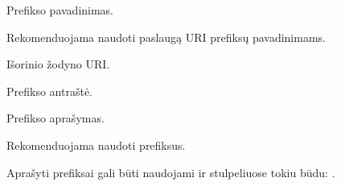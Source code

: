 \documentclass[letterpaper,10pt,lithuanian]{sphinxmanual}
\begin{document}
\begin{fulllineitems}
\label{\detokenize{dimensijos:prefix.ref}}
\pysigstartsignatures
\pysigline
{}
\pysigstopsignatures
\sphinxAtStartPar
Prefikso pavadinimas.

\sphinxAtStartPar
Rekomenduojama naudoti  paslaugą URI prefiksų pavadinimams.

\end{fulllineitems}


\begin{fulllineitems}
\label{\detokenize{dimensijos:prefix.uri}}
\pysigstartsignatures
\pysigline
{}
\pysigstopsignatures
\sphinxAtStartPar
Išorinio žodyno URI.

\end{fulllineitems}


\begin{fulllineitems}
\label{\detokenize{dimensijos:prefix.title}}
\pysigstartsignatures
\pysigline
{}
\pysigstopsignatures
\sphinxAtStartPar
Prefikso antraštė.

\end{fulllineitems}


\begin{fulllineitems}
\label{\detokenize{dimensijos:prefix.description}}
\pysigstartsignatures
\pysigline
{}
\pysigstopsignatures
\sphinxAtStartPar
Prefikso aprašymas.

\end{fulllineitems}


\sphinxAtStartPar
Rekomenduojama naudoti  prefiksus.

\sphinxAtStartPar
Aprašyti prefiksai gali būti naudojami {\hyperref[\detokenize{dimensijos:model.uri}]{}} ir {\hyperref[\detokenize{dimensijos:property.uri}]{}}
stulpeliuose tokiu būdu: .
\end{document}
